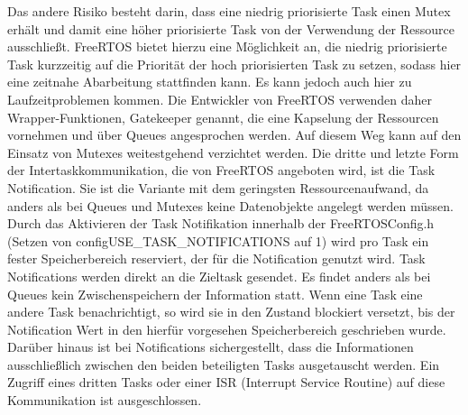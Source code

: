 Das andere Risiko besteht darin, dass eine niedrig priorisierte Task einen Mutex erhält und damit eine höher priorisierte Task von der Verwendung der Ressource ausschließt. FreeRTOS bietet hierzu eine Möglichkeit an, die niedrig priorisierte Task kurzzeitig auf die Priorität der hoch priorisierten Task zu setzen, sodass hier eine zeitnahe Abarbeitung stattfinden kann. Es kann jedoch auch hier zu Laufzeitproblemen kommen. Die Entwickler von FreeRTOS verwenden daher Wrapper-Funktionen, Gatekeeper genannt, die eine Kapselung der Ressourcen vornehmen und über Queues angesprochen werden. Auf diesem Weg kann auf den Einsatz von Mutexes weitestgehend verzichtet werden.
Die dritte und letzte Form der Intertaskkommunikation, die von FreeRTOS angeboten wird, ist die Task Notification. Sie ist die Variante mit dem geringsten Ressourcenaufwand, da anders als bei Queues und Mutexes keine Datenobjekte angelegt werden müssen. Durch das Aktivieren der Task Notifikation innerhalb der FreeRTOSConfig.h (Setzen von configUSE\_TASK\_NOTIFICATIONS auf 1) wird pro Task ein fester Speicherbereich reserviert, der für die Notification genutzt wird. Task Notifications werden direkt an die Zieltask gesendet. Es findet anders als bei Queues kein Zwischenspeichern der Information statt. Wenn eine Task eine andere Task benachrichtigt, so wird sie in den Zustand blockiert versetzt, bis der Notification Wert in den hierfür vorgesehen Speicherbereich geschrieben wurde. Darüber hinaus ist bei Notifications sichergestellt, dass die Informationen ausschließlich zwischen den beiden beteiligten Tasks ausgetauscht werden. Ein Zugriff eines dritten Tasks oder einer ISR (Interrupt Service Routine) auf diese Kommunikation ist ausgeschlossen.